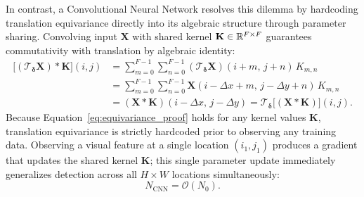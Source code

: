 In contrast, a Convolutional Neural Network resolves this dilemma by hardcoding translation equivariance directly into its algebraic structure through parameter sharing. Convolving input $\mathbf{X}$ with shared kernel $\mathbf{K} \in \mathbb{R}^{F \times F}$ guarantees commutativity with translation by algebraic identity:
\begin{equation}
\begin{aligned}
\big[ (\mathcal{T}_{\boldsymbol{\delta}} \mathbf{X}) * \mathbf{K} \big](i, j) &= \sum_{m=0}^{F-1} \sum_{n=0}^{F-1} (\mathcal{T}_{\boldsymbol{\delta}} \mathbf{X})(i+m, \, j+n) \, K_{m, n} \\
&= \sum_{m=0}^{F-1} \sum_{n=0}^{F-1} \mathbf{X}(i - \Delta x + m, \, j - \Delta y + n) \, K_{m, n} \\
&= (\mathbf{X} * \mathbf{K})(i - \Delta x, \, j - \Delta y) = \mathcal{T}_{\boldsymbol{\delta}} \big[ (\mathbf{X} * \mathbf{K}) \big](i, j).
\end{aligned}
\label{eq:equivariance_proof}
\end{equation}
Because Equation~\eqref{eq:equivariance_proof} holds for any kernel values $\mathbf{K}$, translation equivariance is strictly hardcoded prior to observing any training data. Observing a visual feature at a single location $(i_1, j_1)$ produces a gradient that updates the shared kernel $\mathbf{K}$; this single parameter update immediately generalizes detection across all $H \times W$ locations simultaneously:
\begin{equation}
N_{\text{CNN}} = \mathcal{O}(N_0).
\label{eq:sample_complexity_cnn}
\end{equation}

